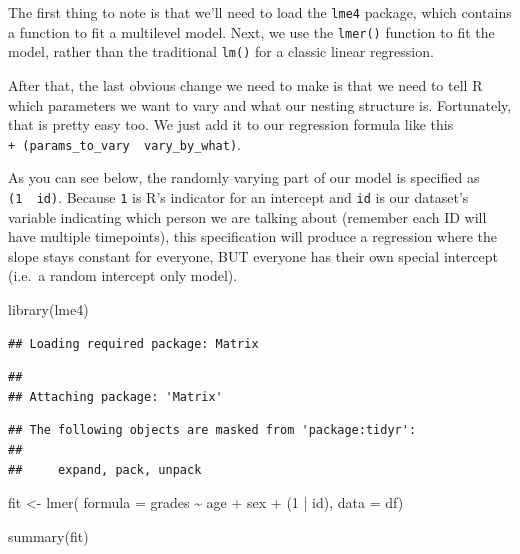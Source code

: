 \documentclass[
]{book}
\newenvironment{Shaded}{\begin{snugshade}}{\end{snugshade}}
\newcommand{\AttributeTok}[1]{\textcolor[rgb]{0.77,0.63,0.00}{#1}}
\newcommand{\DecValTok}[1]{\textcolor[rgb]{0.00,0.00,0.81}{#1}}
\newcommand{\FunctionTok}[1]{\textcolor[rgb]{0.00,0.00,0.00}{#1}}
\newcommand{\NormalTok}[1]{#1}
\newcommand{\OtherTok}[1]{\textcolor[rgb]{0.56,0.35,0.01}{#1}}
\newcommand{\SpecialCharTok}[1]{\textcolor[rgb]{0.00,0.00,0.00}{#1}}
\begin{document}
The first thing to note is that we'll need to load the \texttt{lme4} package, which contains a function to fit a multilevel model. Next, we use the \texttt{lmer()} function to fit the model, rather than the traditional \texttt{lm()} for a classic linear regression.

After that, the last obvious change we need to make is that we need to tell R which parameters we want to vary and what our nesting structure is. Fortunately, that is pretty easy too. We just add it to our regression formula like this \texttt{+\ (params\_to\_vary\ \textbar{}\ vary\_by\_what)}.

As you can see below, the randomly varying part of our model is specified as \texttt{(1\ \textbar{}\ id)}. Because \texttt{1} is R's indicator for an intercept and \texttt{id} is our dataset's variable indicating which person we are talking about (remember each ID will have multiple timepoints), this specification will produce a regression where the slope stays constant for everyone, BUT everyone has their own special intercept (i.e.~a random intercept only model).

\begin{Shaded}
\begin{Highlighting}[]
\FunctionTok{library}\NormalTok{(lme4)}
\end{Highlighting}
\end{Shaded}

\begin{verbatim}
## Loading required package: Matrix
\end{verbatim}

\begin{verbatim}
## 
## Attaching package: 'Matrix'
\end{verbatim}

\begin{verbatim}
## The following objects are masked from 'package:tidyr':
## 
##     expand, pack, unpack
\end{verbatim}

\begin{Shaded}
\begin{Highlighting}[]
\NormalTok{fit }\OtherTok{\textless{}{-}} \FunctionTok{lmer}\NormalTok{(}
  \AttributeTok{formula =}\NormalTok{ grades }\SpecialCharTok{\textasciitilde{}}\NormalTok{ age }\SpecialCharTok{+}\NormalTok{ sex }\SpecialCharTok{+}\NormalTok{ (}\DecValTok{1} \SpecialCharTok{|}\NormalTok{ id),}
  \AttributeTok{data =}\NormalTok{ df)}

\FunctionTok{summary}\NormalTok{(fit)}
\end{Highlighting}
\end{Shaded}
\end{document}

